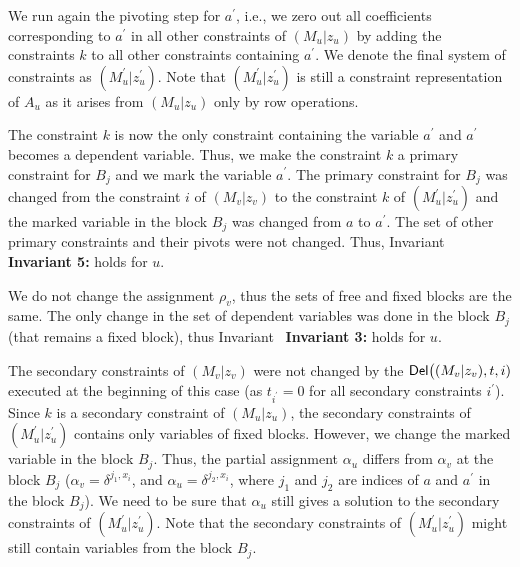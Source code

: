 \documentclass[10pt,a4paper]{article}
\begin{document}
We run again the pivoting step for $a^{\prime}$, i.e., we zero out all coefficients corresponding to $a^{\prime}$ in all other constraints of $(M_{u}|z_{u})$ by adding the constraints $k$ to all other constraints containing $a^{\prime}$.
We denote the final system of constraints as $(M^{\prime}_{u}|z^{\prime}_{u})$.
Note that $(M^{\prime}_{u}|z^{\prime}_{u})$ is still a constraint representation of $A_{u}$ as it arises from $(M_{u}|z_{u})$ only by row operations.\par




The constraint $k$ is now the only constraint containing the variable $a^{\prime}$ and $a^{\prime}$ becomes a dependent variable.
Thus, we make the constraint $k$ a primary constraint for $B_{j}$ and we mark the variable $a^{\prime}$.
The primary constraint for $B_{j}$ was changed from the constraint $i$ of $(M_{v}|z_{v})$ to the constraint $k$ of $(M^{\prime}_{u}|z^{\prime}_{u})$ and the marked variable in the block $B_{j}$ was changed from $a$ to $a^{\prime}$.
The set of other primary constraints and their pivots were not changed.
Thus, Invariant \textbf{ Invariant 5:} holds for $u$.\par




We do not change the assignment $\rho_{v}$, thus the sets of free and fixed blocks are the same.
The only change in the set of dependent variables was done in the block $B_{j}$ (that remains a fixed block), thus Invariant \textbf{ Invariant 3:} holds for $u$.\par




The secondary constraints of $(M_{v}|z_{v})$ were not changed by the $\mathsf{Del}\bigl{(}(M_{v}|z_{v}),t,i)$ executed at the beginning of this case (as $t_{i^{\prime}}=0$ for all secondary constraints $i^{\prime}$).
Since $k$ is a secondary constraint of $(M_{u}|z_{u})$, the secondary constraints of $(M^{\prime}_{u}|z^{\prime}_{u})$ contains only variables of fixed blocks.
However, we change the marked variable in the block $B_{j}$.
Thus, the partial assignment $\alpha_{u}$ differs from $\alpha_{v}$ at the block $B_{j}$ ($\alpha_{v}=\delta^{j_{1},x_{i}}$, and $\alpha_{u}=\delta^{j_{2},x_{i}}$, where $j_{1}$ and $j_{2}$ are indices of $a$ and $a^{\prime}$ in the block $B_{j}$).
We need to be sure that $\alpha_{u}$ still gives a solution to the secondary constraints of $(M^{\prime}_{u}|z^{\prime}_{u})$.
Note that the secondary constraints of $(M^{\prime}_{u}|z^{\prime}_{u})$ might still contain variables from the block $B_{j}$.\par
\end{document}
